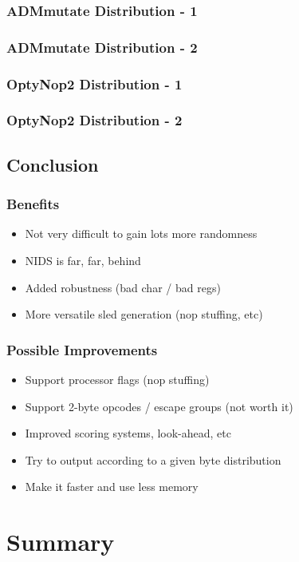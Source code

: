 \documentclass{beamer}
\begin{document}
\begin{frame}[fragile]
  \frametitle{ADMmutate Distribution - 1}
  
\end{frame}
\begin{frame}[fragile]
  \frametitle{ADMmutate Distribution - 2}
  
\end{frame}
\begin{frame}[fragile]
  \frametitle{OptyNop2 Distribution - 1}
  
\end{frame}
\begin{frame}[fragile]
  \frametitle{OptyNop2 Distribution - 2}
  
\end{frame}

\subsection{Conclusion}
\begin{frame}
  \frametitle{Benefits}
  \begin{itemize}
    \item Not very difficult to gain lots more randomness
    \item NIDS is far, far, behind
    \item Added robustness (bad char / bad regs)
    \item More versatile sled generation (nop stuffing, etc)
  \end{itemize}
\end{frame}
\begin{frame}
  \frametitle{Possible Improvements}
  \begin{itemize}
    \item Support processor flags (nop stuffing)
    \item Support 2-byte opcodes / escape groups (not worth it)
    \item Improved scoring systems, look-ahead, etc
    \item Try to output according to a given byte distribution
    \item Make it faster and use less memory
  \end{itemize}
\end{frame}


\section*{Summary}
\end{document}
